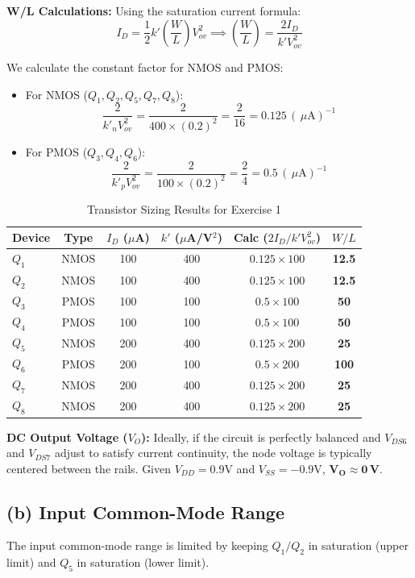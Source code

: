 \documentclass[11pt, a4paper]{article}
\newcommand{\uA}{\,\mu\text{A}}
\begin{document}
\textbf{W/L Calculations:}
Using the saturation current formula:
\[ I_D = \frac{1}{2} k' \left(\frac{W}{L}\right) V_{ov}^2 \implies \left(\frac{W}{L}\right) = \frac{2 I_D}{k' V_{ov}^2} \]

We calculate the constant factor for NMOS and PMOS:
\begin{itemize}
    \item For NMOS ($Q_1, Q_2, Q_5, Q_7, Q_8$):
    \[ \frac{2}{k'_n V_{ov}^2} = \frac{2}{400 \times (0.2)^2} = \frac{2}{16} = 0.125 \, (\uA)^{-1} \]
    \item For PMOS ($Q_3, Q_4, Q_6$):
    \[ \frac{2}{k'_p V_{ov}^2} = \frac{2}{100 \times (0.2)^2} = \frac{2}{4} = 0.5 \, (\uA)^{-1} \]
\end{itemize}

\begin{table}[H]
\centering
\caption{Transistor Sizing Results for Exercise 1}
\begin{tabular}{lccccc}
\toprule
\textbf{Device} & \textbf{Type} & \textbf{$I_D$ ($\mu$A)} & \textbf{$k'$ ($\mu$A/V$^2$)} & \textbf{Calc ($2 I_D / k' V_{ov}^2$)} & \textbf{$W/L$} \\
\midrule
$Q_1$ & NMOS & 100 & 400 & $0.125 \times 100$ & \textbf{12.5} \\
$Q_2$ & NMOS & 100 & 400 & $0.125 \times 100$ & \textbf{12.5} \\
$Q_3$ & PMOS & 100 & 100 & $0.5 \times 100$ & \textbf{50} \\
$Q_4$ & PMOS & 100 & 100 & $0.5 \times 100$ & \textbf{50} \\
$Q_5$ & NMOS & 200 & 400 & $0.125 \times 200$ & \textbf{25} \\
$Q_6$ & PMOS & 200 & 100 & $0.5 \times 200$ & \textbf{100} \\
$Q_7$ & NMOS & 200 & 400 & $0.125 \times 200$ & \textbf{25} \\
$Q_8$ & NMOS & 200 & 400 & $0.125 \times 200$ & \textbf{25} \\
\bottomrule
\end{tabular}
\end{table}

\noindent\textbf{DC Output Voltage ($V_O$):} Ideally, if the circuit is perfectly balanced and $V_{DS6}$ and $V_{DS7}$ adjust to satisfy current continuity, the node voltage is typically centered between the rails. Given $V_{DD}=0.9\text{V}$ and $V_{SS}=-0.9\text{V}$, $\mathbf{V_O \approx 0\,\text{V}}$.

\subsection*{(b) Input Common-Mode Range}
The input common-mode range is limited by keeping $Q_1/Q_2$ in saturation (upper limit) and $Q_5$ in saturation (lower limit).
\end{document}
